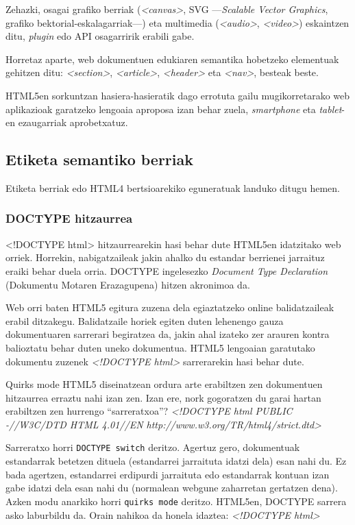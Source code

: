 Zehazki, osagai grafiko berriak (\textit{<canvas>}, SVG —\textit{Scalable Vector Graphics}, grafiko bektorial-eskalagarriak—) eta multimedia (\textit{<audio>}, \textit{<video>}) eskaintzen ditu, \textit{plugin} edo API osagarririk erabili gabe.

Horretaz aparte, web dokumentuen edukiaren semantika hobetzeko elementuak gehitzen ditu: \textit{<section>}, \textit{<article>}, \textit{<header>} eta \textit{<nav>}, besteak beste.

HTML5en sorkuntzan hasiera-hasieratik dago errotuta gailu mugikorretarako web aplikazioak garatzeko lengoaia aproposa izan behar zuela, \textit{smartphone} eta \textit{tablet}-en ezaugarriak aprobetxatuz.

\subsection{Etiketa semantiko berriak}
Etiketa berriak edo HTML4 bertsioarekiko eguneratuak landuko ditugu hemen.

\subsubsection{DOCTYPE hitzaurrea}
<!DOCTYPE html> hitzaurrearekin hasi behar dute HTML5en idatzitako web orriek. Horrekin, nabigatzaileak jakin ahalko du estandar berrienei jarraituz eraiki behar duela orria. DOCTYPE ingelesezko \textit{Document Type Declaration} (Dokumentu Motaren Erazagupena) hitzen akronimoa da.

Web orri baten HTML5 egitura zuzena dela egiaztatzeko online balidatzaileak erabil ditzakegu. Balidatzaile horiek egiten duten lehenengo gauza dokumentuaren sarrerari begiratzea da, jakin ahal izateko zer arauren kontra balioztatu behar duten uneko dokumentua. HTML5 lengoaian garatutako dokumentu zuzenek \textit{<!DOCTYPE html>} sarrerarekin hasi behar dute.

\vspace{0.5cm}
\begin{alertinfo}{Quirks mode}
    HTML5 diseinatzean ordura arte erabiltzen zen dokumentuen hitzaurrea erraztu nahi izan zen. Izan ere, nork gogoratzen du garai hartan erabiltzen zen hurrengo ``sarreratxoa''?
   \textit{<!DOCTYPE html PUBLIC \textquotedbl-//W3C/DTD HTML 4.01//EN\textquotedbl{}   \textquotedbl http://www.w3.org/TR/html4/strict.dtd\textquotedbl>}

Sarreratxo horri \texttt{DOCTYPE switch} deritzo. Agertuz gero, dokumentuak estandarrak betetzen dituela (estandarrei jarraituta idatzi dela) esan nahi du. Ez bada agertzen, estandarrei erdipurdi jarraituta edo estandarrak kontuan izan gabe idatzi dela esan nahi du (normalean webgune zaharretan gertatzen dena). Azken modu anarkiko horri \texttt{quirks mode} deritzo. HTML5en, DOCTYPE sarrera asko laburbildu da. Orain nahikoa da honela idaztea: \textit{<!DOCTYPE html>}
 
    \end{alertinfo}

